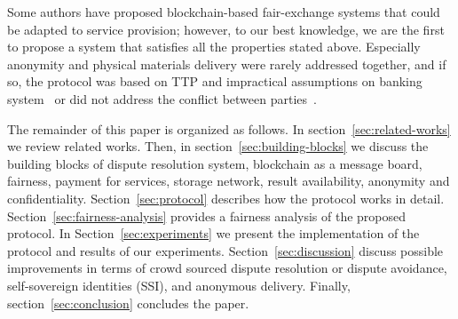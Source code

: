 \documentclass{ieeeaccess}
\begin{document}

Some authors have proposed blockchain-based fair-exchange systems that could be adapted to service provision; however, to our best knowledge, we are the first to propose a system that satisfies all the properties stated above. Especially anonymity and physical materials delivery were rarely addressed together, and if so, the protocol was based on TTP and impractical assumptions on banking system~\cite{birjoveanuAnonymityFairexchangeEcommerce2015} or did not address the conflict between parties~\cite{altawyLelantosBlockchainBasedAnonymous2017}.


The remainder of this paper is organized as follows.
In section~\ref{sec:related-works} we review related works. 
Then, in section~\ref{sec:building-blocks} we discuss the building blocks of dispute resolution system, blockchain as a message board, fairness, payment for services, storage network, result availability, anonymity and confidentiality.
Section~\ref{sec:protocol} describes how the protocol works in detail.
Section~\ref{sec:fairness-analysis} provides a fairness analysis of the proposed protocol.
In Section~\ref{sec:experiments} we present the implementation of the protocol and results of our experiments.
Section~\ref{sec:discussion} discuss possible improvements in terms of crowd sourced dispute resolution or dispute avoidance, self-sovereign identities (SSI), and anonymous delivery.
Finally, section~\ref{sec:conclusion} concludes the paper.
\end{document}
